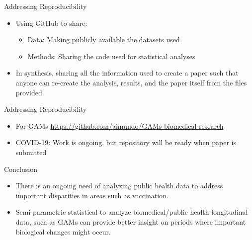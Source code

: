\documentclass[
  ignorenonframetext,
]{beamer}
\begin{document}
\begin{frame}{Addressing Reproducibility}
\protect\hypertarget{addressing-reproducibility-1}{}
\begin{itemize}[<+->]
\item
  Using GitHub to share:

  \begin{itemize}[<+->]
  \item
    Data: Making publicly available the datasets used
  \item
    Methods: Sharing the code used for statistical analyses
  \end{itemize}
\item
  In synthesis, sharing all the information used to create a paper such
  that anyone can re-create the analysis, results, and the paper itself
  from the files provided.
\end{itemize}
\end{frame}

\begin{frame}{Addressing Reproducibility}
\protect\hypertarget{addressing-reproducibility-2}{}
\begin{itemize}[<+->]
\item
  For GAMs \url{https://github.com/aimundo/GAMs-biomedical-research}
\item
  COVID-19: Work is ongoing, but repository will be ready when paper is
  submitted
\end{itemize}
\end{frame}

\begin{frame}{Conclusion}
\protect\hypertarget{conclusion}{}
\begin{itemize}[<+->]
\item
  There is an ongoing need of analyzing public health data to address
  important disparities in areas such as vaccination.
\item
  Semi-parametric statistical to analyze biomedical/public health
  longitudinal data, such as GAMs can provide better insight on periods
  where important biological changes might occur.
\end{itemize}
\end{frame}
\end{document}

